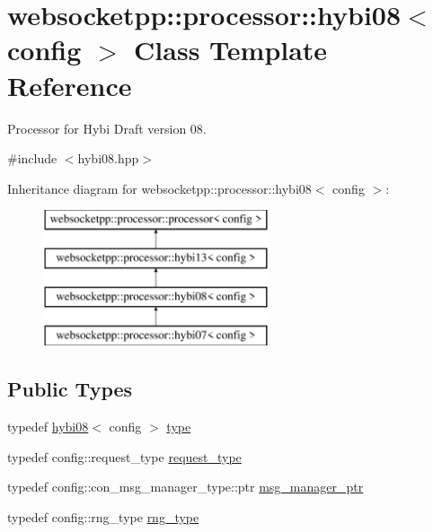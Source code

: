 \hypertarget{classwebsocketpp_1_1processor_1_1hybi08}{}\section{websocketpp\+:\+:processor\+:\+:hybi08$<$ config $>$ Class Template Reference}
\label{classwebsocketpp_1_1processor_1_1hybi08}


Processor for Hybi Draft version 08.  




{\ttfamily \#include $<$hybi08.\+hpp$>$}

Inheritance diagram for websocketpp\+:\+:processor\+:\+:hybi08$<$ config $>$\+:\begin{figure}[H]
\begin{center}
\leavevmode
\includegraphics[height=4.000000cm]{classwebsocketpp_1_1processor_1_1hybi08}
\end{center}
\end{figure}
\subsection*{Public Types}
\begin{DoxyCompactItemize}
\item 
typedef \hyperlink{classwebsocketpp_1_1processor_1_1hybi08}{hybi08}$<$ config $>$ \hyperlink{classwebsocketpp_1_1processor_1_1hybi08_adb295a175e3c45fad340b974c9daa780}{type}
\item 
typedef config\+::request\+\_\+type \hyperlink{classwebsocketpp_1_1processor_1_1hybi08_a5cb5a8054a9e10706e672de379284a2e}{request\+\_\+type}
\item 
typedef config\+::con\+\_\+msg\+\_\+manager\+\_\+type\+::ptr \hyperlink{classwebsocketpp_1_1processor_1_1hybi08_a4ad1477463712031772e8e8a48cdc7b0}{msg\+\_\+manager\+\_\+ptr}
\item 
typedef config\+::rng\+\_\+type \hyperlink{classwebsocketpp_1_1processor_1_1hybi08_af8b10cde566c24d29a94f50716fdcddd}{rng\+\_\+type}
\end{DoxyCompactItemize}
